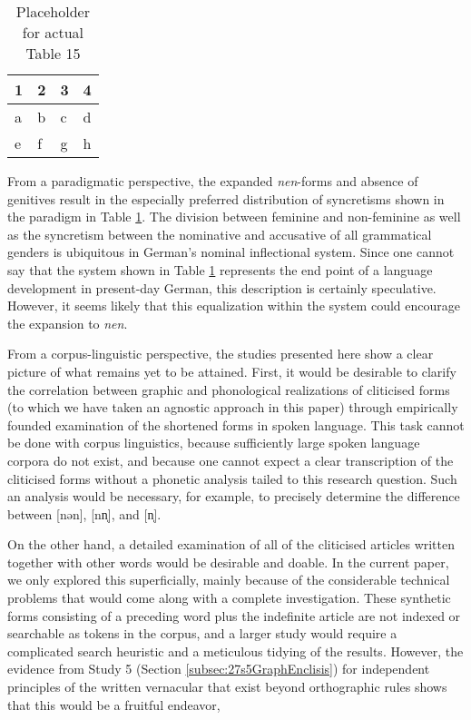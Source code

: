 \begin{table}
	\centering
	\begin{tabular}{llll}
		\toprule
		\textbf{1} & \textbf{2} & \textbf{3} & \textbf{4} \\
		\midrule
		a & b & c & d \\
		e & f & g & h \\
		\bottomrule
	\end{tabular}
	\caption{Placeholder for actual Table 15}
	\label{tab:0015}
\end{table}

From a paradigmatic perspective, the expanded \textit{nen}-forms and absence of genitives result in the especially preferred distribution of syncretisms shown in the paradigm in Table \ref{tab:0015}.
The division between feminine and non-feminine as well as the syncretism between the nominative and accusative of all grammatical genders is ubiquitous in German's nominal inflectional system.
Since one cannot say that the system shown in Table \ref{tab:0015} represents the end point of a language development in present-day German, this description is certainly speculative.
However, it seems likely that this equalization within the system could encourage the expansion to \textit{nen}.

From a corpus-linguistic perspective, the studies presented here show a clear picture of what remains yet to be attained.
First, it would be desirable to clarify the correlation between graphic and phonological realizations of cliticised forms (to which we have taken an agnostic approach in this paper) through empirically founded examination of the shortened forms in spoken language.
This task cannot be done with corpus linguistics, because sufficiently large spoken language corpora do not exist, and because one cannot expect a clear transcription of the cliticised forms without a phonetic analysis tailed to this research question.
Such an analysis would be necessary, for example, to precisely determine the difference between [nən], [nn̩], and [n̩].

On the other hand, a detailed examination of all of the cliticised articles written together with other words would be desirable and doable.
In the current paper, we only explored this superficially, mainly because of the considerable technical problems that would come along with a complete investigation.
These synthetic forms consisting of a preceding word plus the indefinite article are not indexed or searchable as tokens in the corpus, and a larger study would require a complicated search heuristic and a meticulous tidying of the results.
However, the evidence from Study 5 (Section \ref{subsec:27s5GraphEnclisis}) for independent principles of the written vernacular that exist beyond orthographic rules  shows that this would be a fruitful endeavor, 



